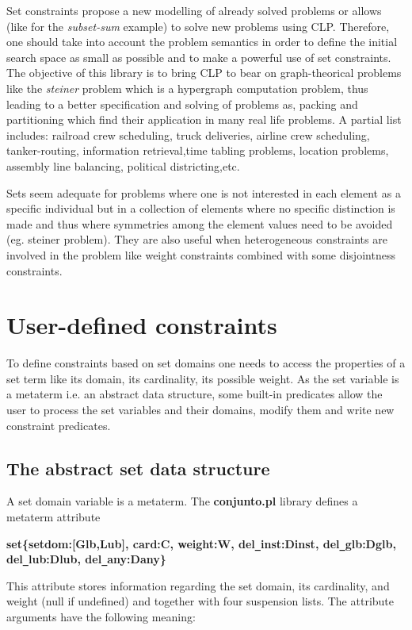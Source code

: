Set constraints propose a new modelling of already solved problems or
allows (like for the {\em subset-sum} example) to solve new problems
using CLP. Therefore, one should take into account the problem
semantics in order to define the initial search space as small as
possible and to make a powerful use of set constraints. The objective
of this library is to bring CLP to bear on graph-theorical problems
like the {\em steiner} problem which is a hypergraph computation
problem, thus leading to a better specification and solving of
problems as, packing and partitioning which find their application in
many real life problems.  A partial list includes: railroad crew
scheduling, truck deliveries, airline crew scheduling, tanker-routing,
information retrieval,time tabling problems, location problems,
assembly line balancing, political districting,etc.

Sets seem adequate for problems where one is not interested in each
element as a specific individual but in a collection of elements where
no specific distinction is made and thus where symmetries among the
element values need to be avoided (eg. steiner problem). They are also
useful when heterogeneous constraints are involved in the problem like
weight constraints combined with some disjointness constraints.
\section{User-defined constraints}

To define constraints based on set domains one needs to
access the properties of a set term like its domain, its cardinality,
its possible weight. As the set variable is a metaterm i.e. an
abstract data structure, some built-in predicates allow the user to
process the set variables and their domains, modify them and write new
constraint predicates. 

\subsection{The abstract set data structure}
A set domain variable is a metaterm. The {\bf conjunto.pl} library
defines a metaterm attribute

{\bf set\{setdom:[Glb,Lub], card:C, weight:W, del\verb/_/inst:Dinst,
del\verb/_/glb:Dglb, del\verb/_/lub:Dlub, del\verb/_/any:Dany\}}

This attribute stores information regarding the set domain, its
cardinality, and weight (null if undefined) and together with four
suspension lists. The attribute arguments have the following meaning:

